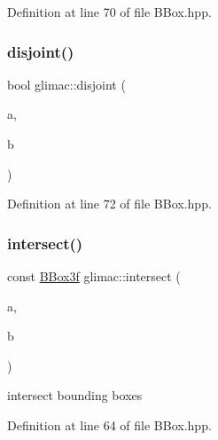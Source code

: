 Definition at line 70 of file B\+Box.\+hpp.

\mbox{\label{namespaceglimac_a505e1fd8b32775d812466a118f7203a0}} 
\subsubsection{\texorpdfstring{disjoint()}{disjoint()}\hspace{0.1cm}{\footnotesize\ttfamily [3/3]}}
{\footnotesize\ttfamily bool glimac\+::disjoint (\begin{DoxyParamCaption}\item[{const \hyperlink{group__core__types_ga1c47e8b3386109bc992b6c48e91b0be7}{glm\+::vec3} \&}]{a,  }\item[{const \hyperlink{structglimac_1_1_b_box3f}{B\+Box3f} \&}]{b }\end{DoxyParamCaption})\hspace{0.3cm}{\ttfamily [inline]}}



Definition at line 72 of file B\+Box.\+hpp.

\mbox{\label{namespaceglimac_adb0bbb865d3fd2206875ff7f350a43dc}} 
\subsubsection{\texorpdfstring{intersect()}{intersect()}\hspace{0.1cm}{\footnotesize\ttfamily [1/2]}}
{\footnotesize\ttfamily const \hyperlink{structglimac_1_1_b_box3f}{B\+Box3f} glimac\+::intersect (\begin{DoxyParamCaption}\item[{const \hyperlink{structglimac_1_1_b_box3f}{B\+Box3f} \&}]{a,  }\item[{const \hyperlink{structglimac_1_1_b_box3f}{B\+Box3f} \&}]{b }\end{DoxyParamCaption})\hspace{0.3cm}{\ttfamily [inline]}}

intersect bounding boxes 

Definition at line 64 of file B\+Box.\+hpp.

\mbox{\label{namespaceglimac_a5ed913fdee93dbfdc38152ff4866e529}} 
